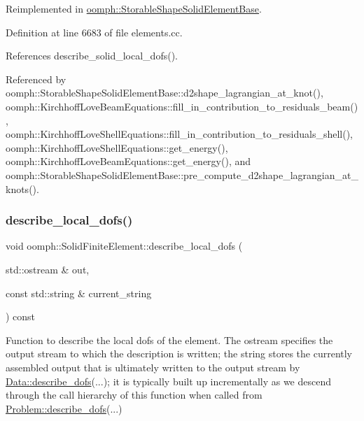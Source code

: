 Reimplemented in \hyperlink{classoomph_1_1StorableShapeSolidElementBase_a55f3ab1f51572cf77e374e4917f47f2b}{oomph\+::\+Storable\+Shape\+Solid\+Element\+Base}.



Definition at line 6683 of file elements.\+cc.



References describe\+\_\+solid\+\_\+local\+\_\+dofs().



Referenced by oomph\+::\+Storable\+Shape\+Solid\+Element\+Base\+::d2shape\+\_\+lagrangian\+\_\+at\+\_\+knot(), oomph\+::\+Kirchhoff\+Love\+Beam\+Equations\+::fill\+\_\+in\+\_\+contribution\+\_\+to\+\_\+residuals\+\_\+beam(), oomph\+::\+Kirchhoff\+Love\+Shell\+Equations\+::fill\+\_\+in\+\_\+contribution\+\_\+to\+\_\+residuals\+\_\+shell(), oomph\+::\+Kirchhoff\+Love\+Shell\+Equations\+::get\+\_\+energy(), oomph\+::\+Kirchhoff\+Love\+Beam\+Equations\+::get\+\_\+energy(), and oomph\+::\+Storable\+Shape\+Solid\+Element\+Base\+::pre\+\_\+compute\+\_\+d2shape\+\_\+lagrangian\+\_\+at\+\_\+knots().

\mbox{\label{classoomph_1_1SolidFiniteElement_ad0eb4d88aa6e0d32560f22706255569c}} 
\subsubsection{\texorpdfstring{describe\+\_\+local\+\_\+dofs()}{describe\_local\_dofs()}}
{\footnotesize\ttfamily void oomph\+::\+Solid\+Finite\+Element\+::describe\+\_\+local\+\_\+dofs (\begin{DoxyParamCaption}\item[{std\+::ostream \&}]{out,  }\item[{const std\+::string \&}]{current\+\_\+string }\end{DoxyParamCaption}) const\hspace{0.3cm}{\ttfamily [virtual]}}



Function to describe the local dofs of the element. The ostream specifies the output stream to which the description is written; the string stores the currently assembled output that is ultimately written to the output stream by \hyperlink{classoomph_1_1Data_a2dae16e2dcff9a40029f834c83364df5}{Data\+::describe\+\_\+dofs}(...); it is typically built up incrementally as we descend through the call hierarchy of this function when called from \hyperlink{classoomph_1_1Problem_abc103804eb319ae0b3d43870cc3e1eaf}{Problem\+::describe\+\_\+dofs}(...) 



